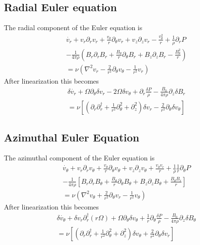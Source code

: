 \documentclass[letterpaper]{article}
\begin{document}
\subsection{Radial Euler equation}

The radial component of the Euler equation is
\begin{align}
\dot{v_r} + v_r \partial_r v_r + \frac{v_\theta}{r}\partial_\theta v_r + v_z \partial_z v_r - \frac{v_\theta^2}{r}+\frac{1}{\rho}\partial_r P 
\\ \nonumber 
- \frac{1}{4\pi\rho}\left(B_r \partial_r B_r + \frac{B_\theta}{r}\partial_\theta B_r + B_z \partial_z B_r - \frac{B_\theta^2}{r}\right)
\\ \nonumber
 = \nu\left(\nabla^2 v_r -\frac{2}{r^2}\partial_\theta v_\theta - \frac{1}{r^2}v_r\right)
\end{align}
After linearization this becomes
\begin{align}
\delta\dot{v_r} + \Omega \partial_\theta \delta v_r - 2\Omega\delta v_\theta + \partial_r \frac{\delta P}{\rho} - \frac{B_0}{4\pi\rho}\partial_z \delta B_r
\\ \nonumber
= \nu \left[\left(\partial_r \partial_r^\dagger + \frac{1}{r^2}\partial_\theta^2 + \partial_z^2\right)\delta v_r - \frac{2}{r^2}\partial_\theta \delta v_\theta\right]
\end{align}

\subsection{Azimuthal Euler Equation}
The azimuthal component of the Euler equation is
\begin{align}
\dot{v_\theta} + v_r \partial_r v_\theta + \frac{v_\theta}{r}\partial_\theta v_\theta + v_z \partial_z v_\theta + \frac{v_\theta v_r}{r} + \frac{1}{\rho}\frac{1}{r}\partial_\theta P 
\\ \nonumber
-\frac{1}{4\pi\rho}\left[B_r\partial_r B_\theta + \frac{B_\theta}{r}\partial_\theta B_\theta + B_z \partial_z B_\theta + \frac{B_\theta B_r}{r}\right]
\\ \nonumber
= \nu\left(\nabla^2 v_\theta + \frac{2}{r^2}\partial_\theta v_r - \frac{1}{r^2}v_\theta \right)
\end{align}
After linearization this becomes
\begin{align}
\delta \dot{v_\theta} + \delta v_r \partial_r^\dagger(r\Omega) + \Omega \partial_\theta \delta v_\theta + \frac{1}{r}\partial_\theta \frac{\delta P}{\rho} - \frac{B_0}{4\pi\rho} \partial_z \delta B_\theta
\\ \nonumber
= \nu\left[\left(\partial_r \partial_r^\dagger + \frac{1}{r^2}\partial_\theta^2 + \partial_z^2\right)\delta v_\theta + \frac{2}{r^2}\partial_\theta \delta v_r \right]
\end{align}
\end{document}
